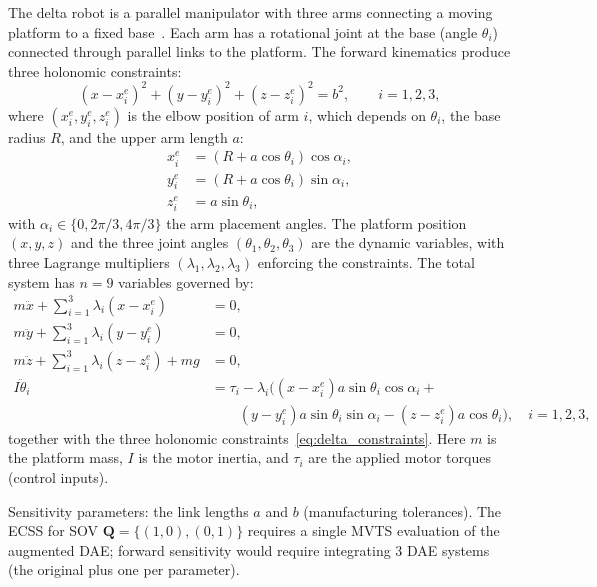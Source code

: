 \documentclass[12pt,a4paper]{article}
\theoremstyle{definition}
\theoremstyle{plain}
\newcommand{\vQ}{\mathbf{Q}}
\begin{document}
The delta robot is a parallel manipulator with three arms connecting a moving platform to a fixed base~\cite{merlet2006parallel}. Each arm has a rotational joint at the base (angle $\theta_i$) connected through parallel links to the platform. The forward kinematics produce three holonomic constraints:
\begin{equation}\label{eq:delta_constraints}
  (x - x_i^e)^2 + (y - y_i^e)^2 + (z - z_i^e)^2 = b^2,\qquad i=1,2,3,
\end{equation}
where $(x_i^e,y_i^e,z_i^e)$ is the elbow position of arm $i$, which depends on $\theta_i$, the base radius $R$, and the upper arm length $a$:
\begin{equation}
  \begin{aligned}
    x_i^e &= (R + a\cos\theta_i)\cos\alpha_i,\\
    y_i^e &= (R + a\cos\theta_i)\sin\alpha_i,\\
    z_i^e &= a\sin\theta_i,
  \end{aligned}
\end{equation}
with $\alpha_i \in \{0, 2\pi/3, 4\pi/3\}$ the arm placement angles. The platform position $(x,y,z)$ and the three joint angles $(\theta_1,\theta_2,\theta_3)$ are the dynamic variables, with three Lagrange multipliers $(\lambda_1,\lambda_2,\lambda_3)$ enforcing the constraints. The total system has $n=9$ variables governed by:
\begin{equation}
  \begin{aligned}
    m\ddot{x} + \sum_{i=1}^{3}\lambda_i(x - x_i^e) &= 0,\\
    m\ddot{y} + \sum_{i=1}^{3}\lambda_i(y - y_i^e) &= 0,\\
    m\ddot{z} + \sum_{i=1}^{3}\lambda_i(z - z_i^e) + mg &= 0,\\
    I\ddot{\theta}_i &=\tau_i - \lambda_i\bigl((x-x_i^e)a\sin\theta_i\cos\alpha_i +{} \\
    &\qquad (y-y_i^e)a\sin\theta_i\sin\alpha_i - (z-z_i^e)a\cos\theta_i\bigr),\quad i=1,2,3,
  \end{aligned}
\end{equation}
together with the three holonomic constraints~\eqref{eq:delta_constraints}. Here $m$ is the platform mass, $I$ is the motor inertia, and $\tau_i$ are the applied motor torques (control inputs).

Sensitivity parameters: the link lengths $a$ and $b$ (manufacturing tolerances). The ECSS for SOV $\vQ = \{(1,0),(0,1)\}$ requires a single MVTS evaluation of the augmented DAE; forward sensitivity would require integrating 3 DAE systems (the original plus one per parameter).
\end{document}
